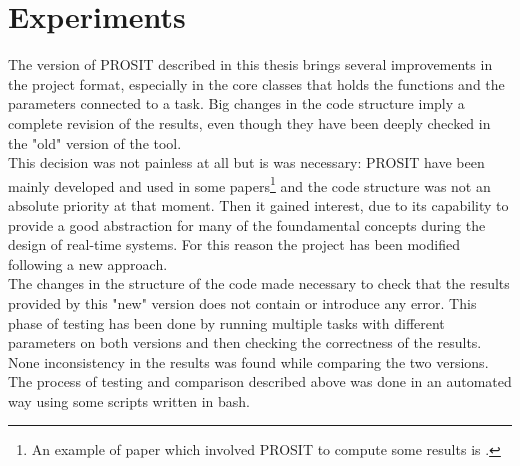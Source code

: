 \chapter{Experiments}\label{chp:experiments}


The version of PROSIT described in this thesis brings several improvements in the project format, especially in the core classes that holds the functions and the parameters connected to a task. Big changes in the code structure imply a complete revision of the results, even though they have been deeply checked in the "old" version of the tool.\\
This decision was not painless at all but is was necessary: PROSIT have been mainly developed and used in some papers\footnote{An example of paper which involved PROSIT to compute some results is \cite{probGuarantees}.} and the code structure was not an absolute priority at that moment. Then it gained interest, due to its capability to provide a good abstraction for many of the foundamental concepts during the design of real-time systems. For this reason the project has been modified following a new approach.\\
The changes in the structure of the code made necessary to check that the results provided by this "new" version does not contain or introduce any error. This phase of testing has been done by running multiple tasks with different parameters on both versions and then checking the correctness of the results. None inconsistency in the results was found while comparing the two versions.\\
The process of testing and comparison described above was done in an automated way using some scripts written in bash.

